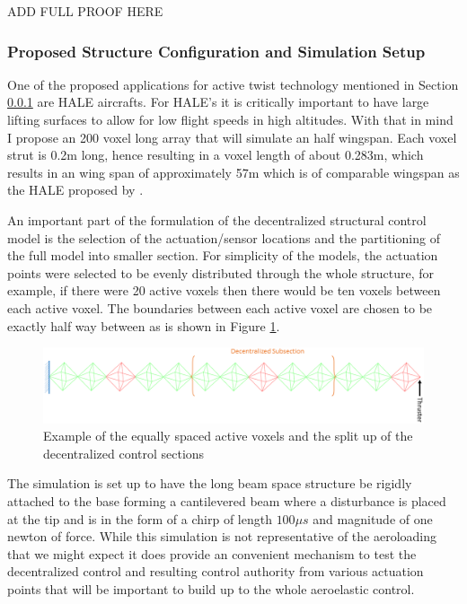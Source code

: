 \documentclass[11pt]{ucthesis}
\begin{document}
{\color{red} ADD FULL PROOF HERE}

\subsubsection{Proposed Structure Configuration and Simulation Setup}
\label{sec:struct}
One of the proposed applications for active twist technology mentioned in Section \ref{sec:struct} are HALE aircrafts. For HALE's it is critically important to have large lifting surfaces to allow for low flight speeds in high altitudes. With that in mind I propose an 200 voxel long array that will simulate an half wingspan. Each voxel strut is 0.2m long, hence resulting in a voxel length of about 0.283m, which results in an wing span of approximately 57m which is of comparable wingspan as the HALE proposed by \cite{goraj1999design}.

An important part of the formulation of the decentralized structural control model is the selection of the actuation/sensor locations and the partitioning of the full model into smaller section. For simplicity of the models, the actuation points were selected to be evenly distributed through the whole structure, for example, if there were 20 active voxels then there would be ten voxels between each active voxel. The boundaries between each active voxel are chosen to be exactly half way between as is shown in Figure \ref{fig:simSetup}.

\begin{figure}[h]
\centering
\includegraphics[width=1\linewidth]{Figures/SimulationSetup.png}
\caption{Example of the equally spaced active voxels and the split up of the decentralized control sections}
\label{fig:simSetup}
\end{figure}

The simulation is set up to have the long beam space structure be rigidly attached to the base forming a cantilevered beam where a disturbance is placed at the tip and is in the form of a chirp of length $100\mu s$ and magnitude of one newton of force. While this simulation is not representative of the aeroloading that we might expect it does provide an convenient mechanism to test the decentralized control and resulting control authority from various actuation points that will be important to build up to the whole aeroelastic control. 
\end{document}
